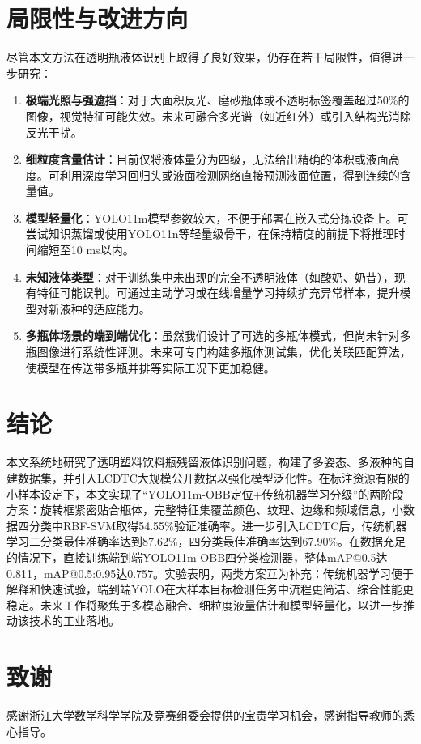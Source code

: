 \documentclass[withoutpreface,bwprint]{cumcmthesis}
\begin{document}
\section{局限性与改进方向}
尽管本文方法在透明瓶液体识别上取得了良好效果，仍存在若干局限性，值得进一步研究：
\begin{enumerate}
    \item \textbf{极端光照与强遮挡}：对于大面积反光、磨砂瓶体或不透明标签覆盖超过50\%的图像，视觉特征可能失效。未来可融合多光谱（如近红外）或引入结构光消除反光干扰。
    \item \textbf{细粒度含量估计}：目前仅将液体量分为四级，无法给出精确的体积或液面高度。可利用深度学习回归头或液面检测网络直接预测液面位置，得到连续的含量值。
    \item \textbf{模型轻量化}：YOLO11m模型参数较大，不便于部署在嵌入式分拣设备上。可尝试知识蒸馏或使用YOLO11n等轻量级骨干，在保持精度的前提下将推理时间缩短至10 ms以内。
    \item \textbf{未知液体类型}：对于训练集中未出现的完全不透明液体（如酸奶、奶昔），现有特征可能误判。可通过主动学习或在线增量学习持续扩充异常样本，提升模型对新液种的适应能力。
    \item \textbf{多瓶体场景的端到端优化}：虽然我们设计了可选的多瓶体模式，但尚未针对多瓶图像进行系统性评测。未来可专门构建多瓶体测试集，优化关联匹配算法，使模型在传送带多瓶并排等实际工况下更加稳健。
\end{enumerate}

\section{结论}
本文系统地研究了透明塑料饮料瓶残留液体识别问题，构建了多姿态、多液种的自建数据集，并引入LCDTC大规模公开数据以强化模型泛化性。在标注资源有限的小样本设定下，本文实现了“YOLO11m-OBB定位+传统机器学习分级”的两阶段方案：旋转框紧密贴合瓶体，完整特征集覆盖颜色、纹理、边缘和频域信息，小数据四分类中RBF-SVM取得54.55\%验证准确率。进一步引入LCDTC后，传统机器学习二分类最佳准确率达到87.62\%，四分类最佳准确率达到67.90\%。在数据充足的情况下，直接训练端到端YOLO11m-OBB四分类检测器，整体mAP@0.5达0.811，mAP@0.5:0.95达0.757。实验表明，两类方案互为补充：传统机器学习便于解释和快速试验，端到端YOLO在大样本目标检测任务中流程更简洁、综合性能更稳定。未来工作将聚焦于多模态融合、细粒度液量估计和模型轻量化，以进一步推动该技术的工业落地。

\section*{致谢}
感谢浙江大学数学科学学院及竞赛组委会提供的宝贵学习机会，感谢指导教师的悉心指导。
\end{document}
